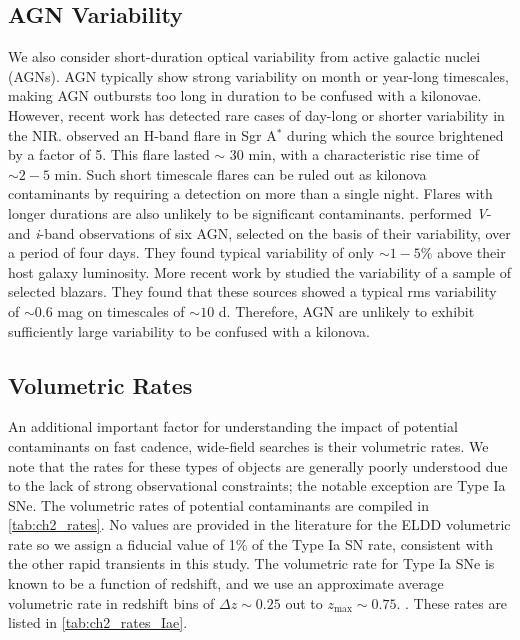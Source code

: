 \subsection{AGN Variability}
\label{sec:ch2_agns}
We also consider short-duration optical variability from active galactic nuclei (AGNs). AGN typically show strong variability on month or year-long timescales, making AGN outbursts too long in duration to be confused with a kilonovae. However, recent work has detected rare cases of day-long  or shorter variability in the NIR. \citet{Genzel+03} observed an H-band flare in Sgr A$^{*}$ during which the source brightened by a factor of 5. This flare lasted $\sim$ 30 min, with a characteristic rise time of $\sim2-5$ min. Such short timescale flares can be ruled out as kilonova contaminants by requiring a detection on more than a single night. Flares with longer durations are also unlikely to be significant contaminants. \citet{Totani+05} performed {\em V}- and {\em i}-band observations of six AGN, selected on the basis of their variability, over a period of four days. They found typical variability of only $\sim1-5\%$ above their host galaxy luminosity. More recent work by \citet{Ruan+12} studied the variability of a sample of \fermi selected blazars. They found that these sources showed a typical rms variability of $\sim0.6$ mag on timescales of $\sim 10$ d. Therefore, AGN are unlikely to exhibit sufficiently large variability to be confused with a kilonova.

\subsection{Volumetric Rates}
\label{sec:ch2_rates}
An additional important factor for understanding the impact of potential contaminants on fast cadence, wide-field searches is their volumetric rates. We note that the rates for these types of objects are generally poorly understood due to the lack of strong observational constraints; the notable exception are Type Ia SNe. The volumetric rates of potential contaminants are compiled in \autoref{tab:ch2_rates}. No values are provided in the literature for the ELDD volumetric rate so we assign a fiducial value of 1\% of the Type Ia SN rate, consistent with the other rapid transients in this study. The volumetric rate for Type Ia SNe is known to be a function of redshift, and we use an approximate average volumetric rate in redshift bins of $\Delta z \sim 0.25$ out to $z_{\text{max}} \sim 0.75$. \citep[][and references therein]{Li+11,Graur+14}. These rates are listed in \autoref{tab:ch2_rates_Iae}.

